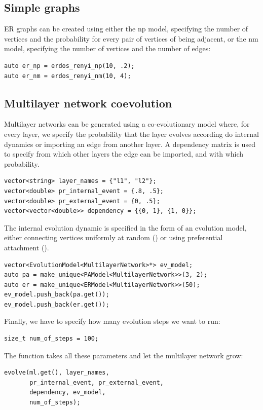 \subsection{Simple graphs}

ER graphs can be created using either the np model, specifying the number of vertices and the probability for every pair of vertices of being adjacent, or the nm model, specifying the number of vertices and the number of edges:
\begin{lstlisting}[style=c++]
auto er_np = erdos_renyi_np(10, .2);
auto er_nm = erdos_renyi_nm(10, 4); 
\end{lstlisting}

\subsection{Multilayer network coevolution}

Multilayer networks can be generated using a co-evolutionary model where, for every layer, we specify the probability that the layer evolves according do internal dynamics or importing an edge from another layer. A dependency matrix is used to specify from which other layers the edge can be imported, and with which probability.
\begin{lstlisting}[style=c++]
vector<string> layer_names = {"l1", "l2"};
vector<double> pr_internal_event = {.8, .5};
vector<double> pr_external_event = {0, .5};
vector<vector<double>> dependency = {{0, 1}, {1, 0}};
\end{lstlisting}

The internal evolution dynamic is specified in the form of an evolution model, either connecting vertices uniformly at random () or using preferential attachment ().
\begin{lstlisting}[style=c++]
vector<EvolutionModel<MultilayerNetwork>*> ev_model;
auto pa = make_unique<PAModel<MultilayerNetwork>>(3, 2);
auto er = make_unique<ERModel<MultilayerNetwork>>(50);
ev_model.push_back(pa.get());
ev_model.push_back(er.get());
\end{lstlisting}

Finally, we have to specify how many evolution steps we want to run:
\begin{lstlisting}[style=c++]
size_t num_of_steps = 100;
\end{lstlisting}
    
The function  takes all these parameters and let the multilayer network grow:
\begin{lstlisting}[style=c++]
evolve(ml.get(), layer_names,
       pr_internal_event, pr_external_event, 
       dependency, ev_model,
       num_of_steps);
\end{lstlisting}

